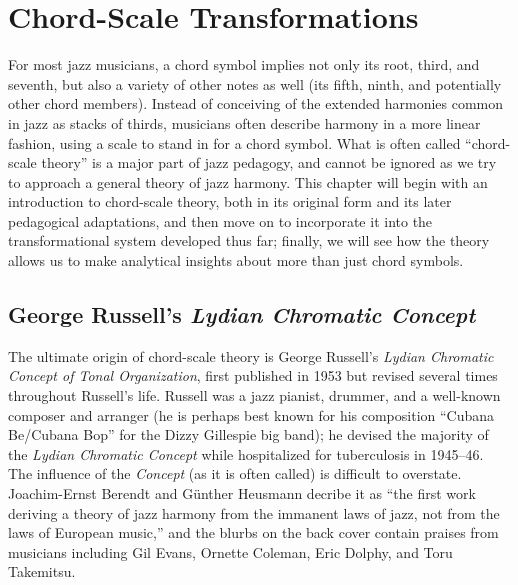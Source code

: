 
\chapter{Chord-Scale Transformations}
\label{chap:chord-scale-transformations}
\addtocspace


For most jazz musicians, a chord symbol implies not only its root, third, and
seventh, but also a variety of other notes as well (its fifth, ninth, and
potentially other chord members). Instead of conceiving of the extended
harmonies common in jazz as stacks of thirds, musicians often describe harmony
in a more linear fashion, using a scale to stand in for a chord symbol. What
is often called ``chord-scale theory'' is a major part of jazz pedagogy, and
cannot be ignored as we try to approach a general theory of jazz harmony. This
chapter will begin with an introduction to chord-scale theory, both in its
original form and its later pedagogical adaptations, and then move on to
incorporate it into the transformational system developed thus far; finally,
we will see how the theory allows us to make analytical insights about more
than just chord symbols.

\section{George Russell’s \emph{Lydian Chromatic Concept}}
\label{sec:lcc}

The ultimate origin of chord-scale theory is George Russell's \emph{Lydian
  Chromatic Concept of Tonal Organization}, first published in 1953 but
revised several times throughout Russell's life. Russell was a jazz
pianist, drummer, and a well-known composer and arranger (he is perhaps best
known for his composition ``Cubana Be/Cubana Bop'' for the Dizzy Gillespie big
band); he devised the majority of the \emph{Lydian Chromatic Concept} while
hospitalized for tuberculosis in 1945--46. The influence of the
\emph{Concept} (as it is often called) is difficult to overstate.
Joachim-Ernst Berendt and Günther Heusmann decribe it as ``the first work
deriving a theory of jazz harmony from the immanent laws of jazz, not from the
laws of European music,'' and the blurbs on the back cover contain praises
from musicians including Gil Evans, Ornette Coleman, Eric Dolphy, and Toru
Takemitsu.

